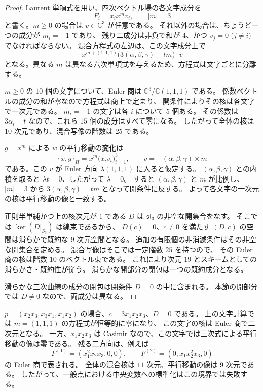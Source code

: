 \begin{proof}
Laurent 単項式を用い、四次ベクトル場の各文字成分を
\[
 F_i=x_ix^m v_i,\qquad |m|=3
\]
と書く。$m\geq0$ の場合は $v\in\mathbb C^3$ が任意である。
それ以外の場合は、ちょうど一つの成分が $m_i=-1$ であり、
残り二成分は非負で和が $4$、かつ $v_j=0$ ($j\neq i$) でなければならない。
混合方程式の左辺は、この文字成分上で
\[
 x^{m+(1,1,1)}
 \bigl(3(\alpha,\beta,\gamma)-tm\bigr)\cdot v
\]
となる。異なる $m$ は異なる六次単項式を与えるため、方程式は文字ごとに分離する。

$m\geq0$ の $10$ 個の文字について、Euler 商は
$\mathbb C^3/\mathbb C(1,1,1)$ である。
係数ベクトルの成分の和が零なので方程式は商上で定まり、
開条件によりその核は各文字で一次元である。
$m_i=-1$ の文字は各 $i$ について $5$ 個ある。
その係数は $3\alpha_i+t$ なので、これら $15$ 個の成分はすべて零になる。
したがって全体の核は $10$ 次元であり、混合写像の階数は $25$ である。

$g=x^m$ による $w$ の平行移動の変化は
\[
 \{x,g\}_\Pi
 =x^m\bigl(x_i v_i\bigr)_{i=1}^3,
 \qquad v=-(\alpha,\beta,\gamma)\times m
\]
である。この $v$ が Euler 方向 $\lambda(1,1,1)$ に入ると仮定する。
$(\alpha,\beta,\gamma)$ との内積を取ると $\lambda t=0$、したがって $\lambda=0$。
すると $(\alpha,\beta,\gamma)$ と $m$ が比例し、
$|m|=3$ から $3(\alpha,\beta,\gamma)=tm$ となって開条件に反する。
よって各文字の一次元の核は平行移動の像と一致する。

正則半単純かつ上の核次元が $1$ である $D$ は
$\mathfrak{sl}_3$ の非空な開集合をなす。
そこでは $\ker(D|_{S_3})$ は線束であるから、
$D(c)=0$、$c\neq0$ を満たす $(D,c)$ の空間は滑らかで既約な $9$ 次元空間となる。
追加の有限個の非消滅条件はその非空な開集合を定める。
混合写像はそこでは一定階数 $25$ を持つので、
その Euler 商の核は階数 $10$ のベクトル束である。
これにより次元 $19$ とスキームとしての滑らかさ・既約性が従う。
滑らかな開部分の閉包は一つの既約成分となる。

滑らかな三次曲線の成分の閉包は閉条件 $D=0$ の中に含まれる。
本節の開部分では $D\neq0$ なので、両成分は異なる。
\end{proof}

\begin{remark}[三角形の境界で残る二方向]
$p=(x_2x_3,x_3x_1,x_1x_2)$ の場合、$c=3x_1x_2x_3$、$D=0$ である。
上の文字計算では $m=(1,1,1)$ の方程式が恒等的に零になり、
この文字の核は Euler 商で二次元となる。
一方、$x_1x_2x_3$ は Casimir なので、この文字では三次式による平行移動の像は零である。
残る二方向は、例えば
\[
 F^{(1)}=(x_1^2x_2x_3,0,0),\qquad
 F^{(2)}=(0,x_1x_2^2x_3,0)
\]
の Euler 商で表される。
全体の混合核は $11$ 次元、平行移動の像は $9$ 次元である。
したがって、一般点における中央変数への標準化はこの境界では失敗する。
\end{remark}

